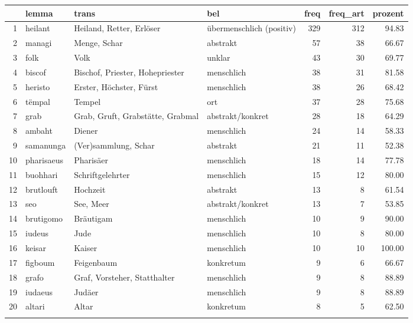 \begin{tabular}{rlllrrr}
  \lsptoprule
 & lemma & trans & bel & freq & freq\_art & prozent \\ 
  \midrule
1 & heilant & Heiland, Retter, Erlöser & übermenschlich (positiv) & 329 & 312 & 94.83 \\ 
  2 & managi & Menge, Schar & abstrakt &  57 &  38 & 66.67 \\ 
  3 & folk & Volk & unklar &  43 &  30 & 69.77 \\ 
  4 & biscof & Bischof, Priester, Hohepriester & menschlich &  38 &  31 & 81.58 \\ 
  5 & heristo & Erster, Höchster, Fürst & menschlich &  38 &  26 & 68.42 \\ 
  6 & tëmpal & Tempel & ort &  37 &  28 & 75.68 \\ 
  7 & grab & Grab, Gruft, Grabstätte, Grabmal & abstrakt/konkret &  28 &  18 & 64.29 \\ 
  8 & ambaht & Diener & menschlich &  24 &  14 & 58.33 \\ 
  9 & samanunga & (Ver)sammlung, Schar & abstrakt &  21 &  11 & 52.38 \\ 
  10 & pharisaeus & Pharisäer & menschlich &  18 &  14 & 77.78 \\ 
  11 & buohhari & Schriftgelehrter & menschlich &  15 &  12 & 80.00 \\ 
  12 & brutlouft & Hochzeit & abstrakt &  13 &   8 & 61.54 \\ 
  13 & seo & See, Meer & abstrakt/konkret &  13 &   7 & 53.85 \\ 
  14 & brutigomo & Bräutigam & menschlich &  10 &   9 & 90.00 \\ 
  15 & iudeus & Jude & menschlich &  10 &   8 & 80.00 \\ 
  16 & keisar & Kaiser & menschlich &  10 &  10 & 100.00 \\ 
  17 & figboum & Feigenbaum & konkretum &   9 &   6 & 66.67 \\ 
  18 & grafo & Graf, Vorsteher, Statthalter & menschlich &   9 &   8 & 88.89 \\ 
  19 & iudaeus & Judäer & menschlich &   9 &   8 & 88.89 \\ 
  20 & altari & Altar & konkretum &   8 &   5 & 62.50 \\ 
   \lspbottomrule
\end{tabular}
